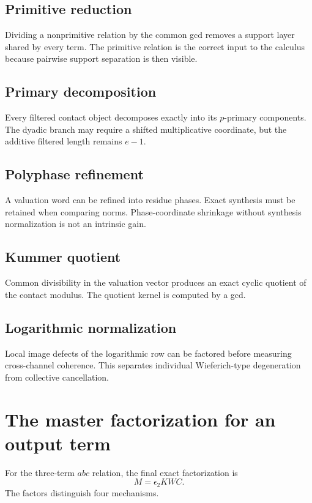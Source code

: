 \subsection{Primitive reduction}
Dividing a nonprimitive relation by the common gcd removes a support layer shared by every term. The primitive relation is the correct input to the calculus because pairwise support separation is then visible.

\subsection{Primary decomposition}
Every filtered contact object decomposes exactly into its $p$-primary components. The dyadic branch may require a shifted multiplicative coordinate, but the additive filtered length remains $e-1$.

\subsection{Polyphase refinement}
A valuation word can be refined into residue phases. Exact synthesis must be retained when comparing norms. Phase-coordinate shrinkage without synthesis normalization is not an intrinsic gain.

\subsection{Kummer quotient}
Common divisibility in the valuation vector produces an exact cyclic quotient of the contact modulus. The quotient kernel is computed by a gcd.

\subsection{Logarithmic normalization}
Local image defects of the logarithmic row can be factored before measuring cross-channel coherence. This separates individual Wieferich-type degeneration from collective cancellation.

\section{The master factorization for an output term}
For the three-term $abc$ relation, the final exact factorization is
\[
\boxed{
M=\epsilon_2KWC.
}
\]
The factors distinguish four mechanisms.

